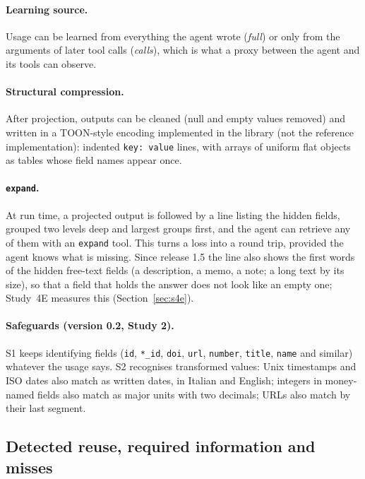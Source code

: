 \paragraph{Learning source.} Usage can be learned from everything the agent wrote (\emph{full}) or only from the
arguments of later tool calls (\emph{calls}), which is what a proxy between the agent and its tools can observe.

\paragraph{Structural compression.} After projection, outputs can be cleaned (null and empty values removed) and
written in a TOON-style encoding \citep{schopplich2026toon} implemented in the library (not the reference
implementation): indented \texttt{key: value} lines, with arrays of uniform flat objects as tables whose field names
appear once.

\paragraph{\texttt{expand}.} At run time, a projected output is followed by a line listing the hidden fields,
grouped two levels deep and largest groups first, and the agent can retrieve any of them with an \texttt{expand}
tool. This turns a loss into a round trip, provided the agent knows what is missing. Since release 1.5 the line
also shows the first words of the hidden free-text fields (a description, a memo, a note; a long text by its size),
so that a field that holds the answer does not look like an empty one; Study~4E measures this (Section~\ref{sec:s4e}).

\paragraph{Safeguards (version 0.2, Study 2).} S1 keeps identifying fields (\texttt{id}, \texttt{*\_id},
\texttt{doi}, \texttt{url}, \texttt{number}, \texttt{title}, \texttt{name} and similar) whatever the usage says.
S2 recognises transformed values: Unix timestamps and ISO dates also match as written dates, in Italian and English;
integers in money-named fields also match as major units with two decimals; URLs also match by their last segment.

\subsection{Detected reuse, required information and misses}
\label{sec:definitions}

